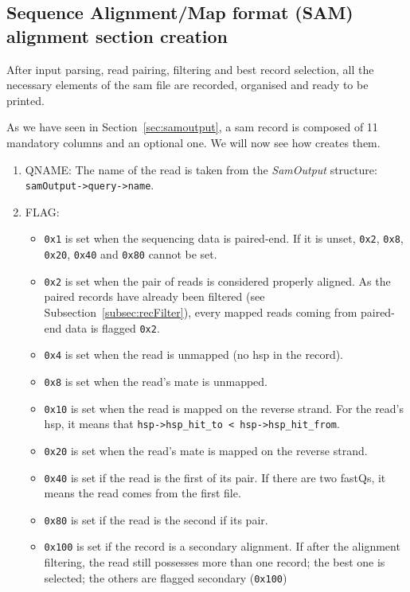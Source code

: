 \subsection{Sequence Alignment\slash{}Map format (SAM) alignment section creation}\label{subsec:samCreation}
After input parsing, read pairing, filtering and best record selection, all the necessary elements of the \gls{sam} file are recorded, organised and ready to be printed.

As we have seen in Section~\ref{sec:samoutput}, a \gls{sam} record is composed of 11 mandatory columns and an optional one.
We will now see how \blastobam{} creates them.
\begin{enumerate}
    \item QNAME\@: The name of the read is taken from the \emph{SamOutput} structure: \texttt{samOutput->\allowbreak{}query->\allowbreak{}name}.
    \item FLAG\@:
    \begin{itemize}
        \item \texttt{0x1} is set when the sequencing data is paired-end. If it is unset, \texttt{0x2}, \texttt{0x8}, \texttt{0x20}, \texttt{0x40} and \texttt{0x80} cannot be set.
        \item \texttt{0x2} is set when the pair of reads is considered properly aligned.
        As the paired records have already been filtered (see Subsection~\ref{subsec:recFilter}), every mapped reads coming from paired-end data is flagged \texttt{0x2}.
        \item \texttt{0x4} is set when the read is unmapped (no \gls{hsp} in the record).
        \item \texttt{0x8} is set when the read's mate is unmapped.
        \item \texttt{0x10} is set when the read is mapped on the reverse strand. For the read's \gls{hsp}, it means that \texttt{hsp->\allowbreak{}hsp\_hit\_to < \allowbreak{}hsp->\allowbreak{}hsp\_hit\_from}.
        \item \texttt{0x20} is set when the read's mate is mapped on the reverse strand.
        \item \texttt{0x40} is set if the read is the first of its pair. If there are two fastQs, it means the read comes from the first file.
        \item \texttt{0x80} is set if the read is the second if its pair.
        \item \texttt{0x100} is set if the record is a secondary alignment.
        If after the alignment filtering, the read still possesses more than one record; the best one is selected; the others are flagged secondary (\texttt{0x100})

\end{itemize}
\end{enumerate}
